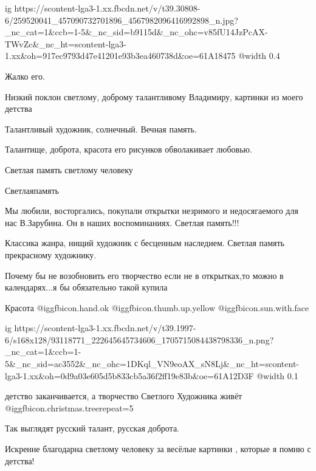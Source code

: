  
 
 
 
 

\ifcmt
  ig https://scontent-lga3-1.xx.fbcdn.net/v/t39.30808-6/259520041_457090732701896_4567982096416992898_n.jpg?_nc_cat=1&ccb=1-5&_nc_sid=b9115d&_nc_ohc=v85fU14JzPcAX-TWvZc&_nc_ht=scontent-lga3-1.xx&oh=917ec9793d47e41201e93b3ea460738d&oe=61A18475
  @width 0.4
\fi

Жалко его.

Низкий поклон светлому, доброму талантливому Владимиру, картинки из моего детства

Талантливый художник, солнечный. Вечная память.

Талантище, доброта, красота его рисунков обволакивает любовью.

Светлая память светлому человеку

Светлаяпамять

Мы любили, восторгались, покупали открытки незримого и недосягаемого для нас В.Зарубина. Он в наших воспоминаниях. Светлая память!!!

Классика жанра, нищий художник с бесценным наследием. Светлая память прекрасному художнику.

Почему бы не возобновить его творчество если не в открытках,то можно в календарях...я бы обязательно такой купила

Красота  @igg{fbicon.hand.ok}   @igg{fbicon.thumb.up.yellow}   @igg{fbicon.sun.with.face} 


\ifcmt
  ig https://scontent-lga3-1.xx.fbcdn.net/v/t39.1997-6/s168x128/93118771_222645645734606_1705715084438798336_n.png?_nc_cat=1&ccb=1-5&_nc_sid=ac3552&_nc_ohc=1DKql_VN9eoAX_sN8Lj&_nc_ht=scontent-lga3-1.xx&oh=0d9a03e605d5b833cb5a36f2ff19e83b&oe=61A12D3F
  @width 0.1
\fi

детство заканчивается, а творчество Светлого Художника живёт  @igg{fbicon.christmas.tree}{repeat=5} 

Так выглядят русский талант, русская доброта.

Искренне благодарна светлому человеку за весёлые картинки , которые я помню с детства!
